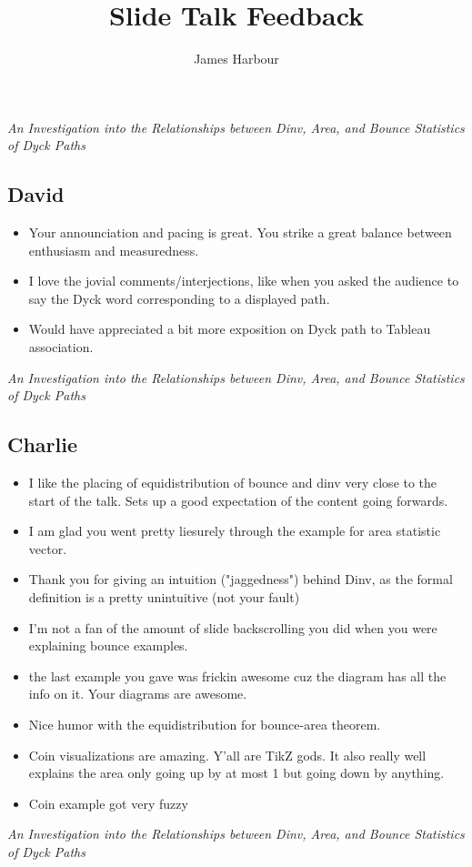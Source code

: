 \documentclass[12pt]{article}
\title{Slide Talk Feedback}
\author{James Harbour}
\begin{document}
\begin{center}
  \Large\textit{An Investigation into the Relationships between Dinv, Area, and Bounce Statistics of Dyck Paths}
\end{center}


\subsection*{David}
\begin{itemize}
  \item Your announciation and pacing is great. You strike a great balance between enthusiasm and measuredness.
  \item I love the jovial comments/interjections, like when you asked the audience to say the Dyck word corresponding to a displayed path.
  \item Would have appreciated a bit more exposition on Dyck path to Tableau association.
\end{itemize}
\newpage
\begin{center}
  \Large\textit{An Investigation into the Relationships between Dinv, Area, and Bounce Statistics of Dyck Paths}
\end{center}


\subsection*{Charlie}
\begin{itemize}
  \item I like the placing of equidistribution of bounce and dinv very close to the start of the talk. Sets up a good expectation of the content going forwards.
  \item I am glad you went pretty liesurely through the example for area statistic vector.
  \item Thank you for giving an intuition ("jaggedness") behind Dinv, as the formal definition is a pretty unintuitive (not your fault)
  \item I'm not a fan of the amount of slide backscrolling you did when you were explaining bounce examples.
  \item the last example you gave was frickin awesome cuz the diagram has all the info on it. Your diagrams are awesome.
  \item Nice humor with the equidistribution for bounce-area theorem.
  \item Coin visualizations are amazing. Y'all are TikZ gods. It also really well explains the area only going up by at most 1 but going down by anything.
  \item Coin example got very fuzzy
\end{itemize}
\newpage
\begin{center}
  \Large\textit{An Investigation into the Relationships between Dinv, Area, and Bounce Statistics of Dyck Paths}
\end{center}
\end{document}
